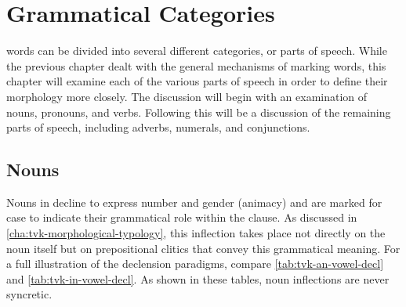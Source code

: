 \chapter{Grammatical Categories}
\label{cha:tvk-grammatical-categories}

\langtvk{} words can be divided into several different categories, or parts of speech. While the previous chapter dealt with the general mechanisms of marking words, this chapter will examine each of the various parts of speech in order to define their morphology more closely. The discussion will begin with an examination of nouns, pronouns, and verbs. Following this will be a discussion of the remaining parts of speech, including adverbs, numerals, and conjunctions.

\section{Nouns}
\label{sec:tvk-nouns}

Nouns in \langtvk{} decline to express number and gender (animacy) and are marked for case to indicate their grammatical role within the clause. As discussed in \autoref{cha:tvk-morphological-typology}, this inflection takes place not directly on the noun itself but on prepositional clitics that convey this grammatical meaning. For a full illustration of the declension paradigms, compare \autoref{tab:tvk-an-vowel-decl} and \autoref{tab:tvk-in-vowel-decl}. As shown in these tables, \langtvk{} noun inflections are never syncretic\autocite{wals-28}.

